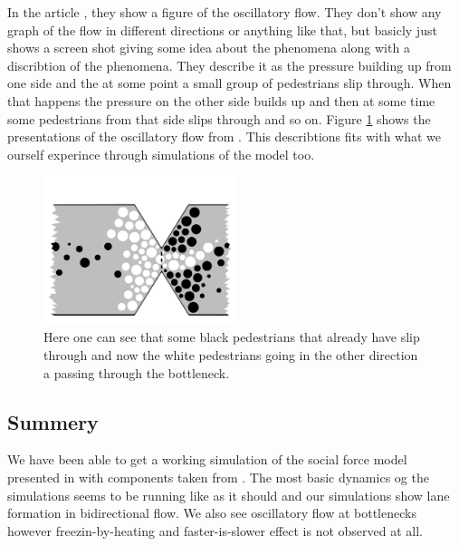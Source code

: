In the article \cite{oscil}, they show a figure of the oscillatory flow. They 
don't show any graph of the flow in different directions or anything like 
that, but basicly just shows a screen shot giving some idea about the 
phenomena along with a discribtion of the phenomena. They describe it as the 
pressure building up from one side and the at some point a small group of 
pedestrians slip through. When that happens the pressure on the other side 
builds up and then at some time some pedestrians from that side slips through 
and so on. Figure \ref{fig:oscillitoryflow_litterature} shows the 
presentations of the oscillatory flow from \cite{oscil}. This describtions 
fits with what we ourself experince through simulations of the model too.

\begin{figure}[h]
    \centering
    \includegraphics[width=0.5\textwidth]{Figures/oscil_flow.png}
    \caption[Oscillatory flow from \cite{oscil}]{Here one can see that some 
    black pedestrians that already have slip through and now the white 
    pedestrians going in the other direction a passing through the 
    bottleneck.}
    \label{fig:oscillitoryflow_litterature}
\end{figure}


\subsection{Summery}
We have been able to get a working simulation of the social force model 
presented in \cite{self-org} with components taken from \cite{ABconstant}. 
The most basic dynamics og the simulations seems to be running like as it 
should and our simulations show lane formation in bidirectional flow. We also  
see oscillatory flow at bottlenecks however freezin-by-heating 
and faster-is-slower effect is not observed at all.
